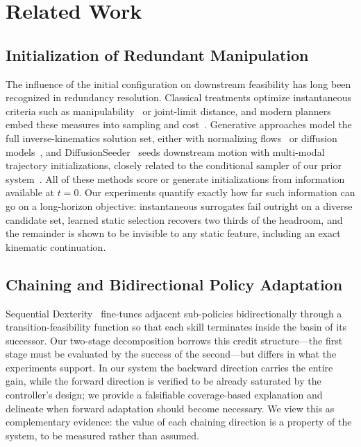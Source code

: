 \documentclass{svproc}
\begin{document}
\section{Related Work}

\subsection{Initialization of Redundant Manipulation}
The influence of the initial configuration on downstream feasibility has long
been recognized in redundancy resolution. Classical treatments optimize
instantaneous criteria such as manipulability~\cite{yoshikawa1985manipulability}
or joint-limit distance, and modern planners embed these measures into
sampling and cost~\cite{shen2023adaptive,cai2025just}. Generative approaches
model the full inverse-kinematics solution set, either with normalizing
flows~\cite{ames2022ikflow} or diffusion models~\cite{zhang2025ikdiffuser},
and DiffusionSeeder~\cite{huang2024diffusionseeder} seeds downstream motion
with multi-modal trajectory initializations, closely related to the
conditional sampler of our prior system~\cite{yuan2026extreme}. All of these
methods score or generate initializations from information available at
$t{=}0$. Our experiments quantify exactly how far such information can go on a
long-horizon objective: instantaneous surrogates fail outright on a diverse
candidate set, learned static selection recovers two thirds of the headroom,
and the remainder is shown to be invisible to any static feature, including an
exact kinematic continuation.

\subsection{Chaining and Bidirectional Policy Adaptation}
Sequential Dexterity~\cite{chen2023sequential} fine-tunes adjacent sub-policies
bidirectionally through a transition-feasibility function so that each skill
terminates inside the basin of its successor. Our two-stage decomposition
borrows this credit structure---the first stage must be evaluated by the
success of the second---but differs in what the experiments support. In our
system the backward direction carries the entire gain, while the forward
direction is verified to be already saturated by the controller's design; we
provide a falsifiable coverage-based explanation and delineate when forward
adaptation should become necessary. We view this as complementary evidence:
the value of each chaining direction is a property of the system, to be
measured rather than assumed.
\end{document}
